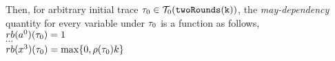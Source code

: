 \begin{example}
    Then, for arbitrary initial trace $\mathtt{\tau}_0 \in \mathcal{T}_0(\mathtt{twoRounds(k)})$,
    the \emph{may-dependency} quantity for every variable under $\mathtt{\tau}_0$ is a function
    as follows,
    \\
    $rb(a^0) (\mathtt{\tau}_0)  = 1$
    \\
    $\cdots$
    \\
    $rb(x^3) (\mathtt{\tau}_0)  = \max\{0, \rho(\mathtt{\tau}_0) k \} $
\end{example}